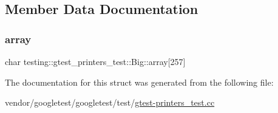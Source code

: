 \subsection{Member Data Documentation}
\mbox{\label{structtesting_1_1gtest__printers__test_1_1_big_a863911a8ec5c3bbe79c44d399f1de61f}} 
\subsubsection{\texorpdfstring{array}{array}}
{\footnotesize\ttfamily char testing\+::gtest\+\_\+printers\+\_\+test\+::\+Big\+::array\mbox{[}257\mbox{]}}



The documentation for this struct was generated from the following file\+:\begin{DoxyCompactItemize}
\item 
vendor/googletest/googletest/test/\hyperlink{gtest-printers__test_8cc}{gtest-\/printers\+\_\+test.\+cc}\end{DoxyCompactItemize}
